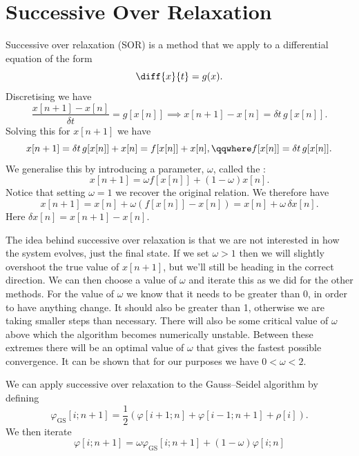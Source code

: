 \documentclass[fleqn]{NotesClass}
\begin{document}
    \section{Successive Over Relaxation}
    Successive over relaxation (SOR) is a method that we apply to a differential equation of the form
    \begin{equation}
        \diff{x}{t} = g(x).
    \end{equation}
    Discretising we have
    \begin{equation}
        \frac{x[n + 1] - x[n]}{\delta t} = g[x[n]] \implies x[n + 1] - x[n] = \delta t\, g[x[n]].
    \end{equation}
    Solving this for \(x[n + 1]\) we have
    \begin{equation}
        x[n + 1] = \delta t\, g[x[n]] + x[n] = f[x[n]] + x[n], \qqwhere f[x[n]] = \delta t\,g[x[n]].
    \end{equation}
    We generalise this by introducing a parameter, \(\omega\), called the :
    \begin{equation}
        x[n + 1] = \omega f[x[n]] + (1 - \omega)x[n].
    \end{equation}
    Notice that setting \(\omega = 1\) we recover the original relation.
    We therefore have
    \begin{equation}
        x[n + 1] = x[n] + \omega(f[x[n]] - x[n]) = x[n] + \omega \, \delta x[n].
    \end{equation}
    Here \(\delta x[n] = x[n + 1] - x[n]\).
    
    The idea behind successive over relaxation is that we are not interested in how the system evolves, just the final state.
    If we set \(\omega > 1\) then we will slightly overshoot the true value of \(x[n + 1]\), but we'll still be heading in the correct direction.
    We can then choose a value of \(\omega\) and iterate this as we did for the other methods.
    For the value of \(\omega\) we know that it needs to be greater than \(0\), in order to have anything change.
    It should also be greater than 1, otherwise we are taking smaller steps than necessary.
    There will also be some critical value of \(\omega\) above which the algorithm becomes numerically unstable.
    Between these extremes there will be an optimal value of \(\omega\) that gives the fastest possible convergence.
    It can be shown that for our purposes we have \(0 < \omega < 2\).
    
    We can apply successive over relaxation to the Gauss--Seidel algorithm by defining
    \begin{equation}
        \varphi_{\mathrm{GS}}[i; n + 1] = \frac{1}{2}(\varphi[i + 1; n] + \varphi[i - 1; n + 1] + \rho[i]).
    \end{equation}
    We then iterate
    \begin{equation}
        \varphi[i; n + 1] = \omega \varphi_{\mathrm{GS}}[i; n + 1] + (1 - \omega)\varphi[i; n]
    \end{equation}
    
\end{document}
